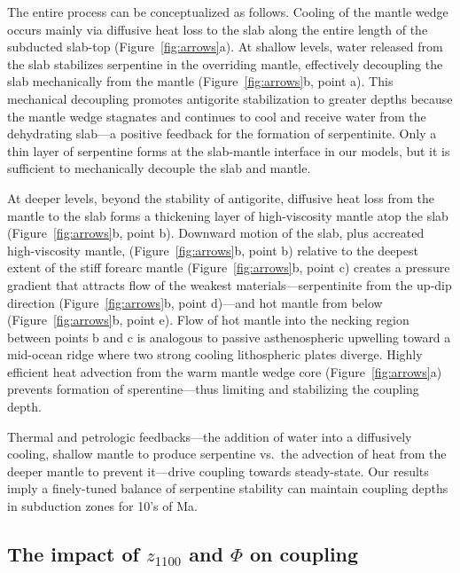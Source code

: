 \documentclass[draft,linenumbers]{agujournal2018}
\begin{document}
The entire process can be conceptualized as follows. Cooling of the
mantle wedge occurs mainly via diffusive heat loss to the slab along the
entire length of the subducted slab-top (Figure~\ref{fig:arrows}a). At
shallow levels, water released from the slab stabilizes serpentine in
the overriding mantle, effectively decoupling the slab mechanically from
the mantle (Figure~\ref{fig:arrows}b, point a). This mechanical
decoupling promotes antigorite stabilization to greater depths because
the mantle wedge stagnates and continues to cool and receive water from
the dehydrating slab---a positive feedback for the formation of
serpentinite. Only a thin layer of serpentine forms at the slab-mantle
interface in our models, but it is sufficient to mechanically decouple
the slab and mantle.

At deeper levels, beyond the stability of antigorite, diffusive heat
loss from the mantle to the slab forms a thickening layer of
high-viscosity mantle atop the slab (Figure~\ref{fig:arrows}b, point b).
Downward motion of the slab, plus accreated high-viscosity mantle,
(Figure~\ref{fig:arrows}b, point b) relative to the deepest extent of
the stiff forearc mantle (Figure~\ref{fig:arrows}b, point c) creates a
pressure gradient that attracts flow of the weakest
materials---serpentinite from the up-dip direction
(Figure~\ref{fig:arrows}b, point d)---and hot mantle from below
(Figure~\ref{fig:arrows}b, point e). Flow of hot mantle into the necking
region between points b and c is analogous to passive asthenospheric
upwelling toward a mid-ocean ridge where two strong cooling lithospheric
plates diverge. Highly efficient heat advection from the warm mantle
wedge core (Figure~\ref{fig:arrows}a) prevents formation of
sperentine---thus limiting and stabilizing the coupling depth.

Thermal and petrologic feedbacks---the addition of water into a
diffusively cooling, shallow mantle to produce serpentine vs.~the
advection of heat from the deeper mantle to prevent it---drive coupling
towards steady-state. Our results imply a finely-tuned balance of
serpentine stability can maintain coupling depths in subduction zones
for 10's of Ma.

\hypertarget{the-impact-of-z_1100-and-phi-on-coupling}{%
\subsection{\texorpdfstring{The impact of \(z_{1100}\) and \(\Phi\) on
coupling}{The impact of z\_\{1100\} and \textbackslash Phi on coupling}}\label{the-impact-of-z_1100-and-phi-on-coupling}}
\end{document}
